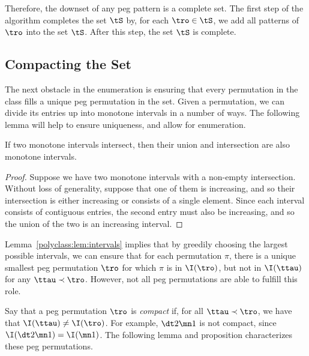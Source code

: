 \documentclass[12pt,twoside]{memoir}
\begin{document}
      Therefore, the downset of any peg pattern is a complete set.  The first
      step of the algorithm completes the set $\tS$ by, 
      for each $\tro \in \tS$, we add all patterns of $\tro$ into the set $\tS$.
      After this step, the set $\tS$ is complete. 

    \subsection{Compacting the Set}


      The next obstacle in the enumeration is ensuring that every permutation in
      the class fills a unique peg permutation in the set.  Given a permutation,
      we can divide its entries up into monotone intervals in a number of ways.
      The following lemma will help to ensure uniqueness, and allow for
      enumeration. 

      \begin{lemma} \label{polyclass:lem:intervals}
        If two monotone intervals intersect, then their union and intersection
        are also monotone intervals.
      \end{lemma}
      \begin{proof}
        Suppose we have two monotone intervals with a non-empty intersection.
        Without loss of generality, suppose that one of them is increasing, and
        so their intersection is either increasing or consists of a single
        element. Since each interval consists of contiguous entries, the second
        entry must also be increasing, and so the union of the two is an
        increasing interval. 
      \end{proof}
      
      Lemma~\ref{polyclass:lem:intervals} implies that by greedily choosing the
      largest possible intervals, we can ensure that for each permutation $\pi$,
      there is a unique smallest peg permutation $\tro$ for which $\pi$ is in
      $\I(\tro)$, but not in $\I(\ttau)$ for any $\ttau \prec \tro$. However, not
      all peg permutations are able to fulfill this role. 

      Say that a peg permutation $\tro$ is \emph{compact} if, for all $\ttau \prec
      \tro$, we have that $\I(\ttau) \not = \I(\tro)$. For example, $\dt 2 \mn 1$
      is not compact, since $\I(\dt 2 \mn 1) = \I(\mn 1)$. The following
      lemma and proposition characterizes these peg permutations. 
\end{document}
